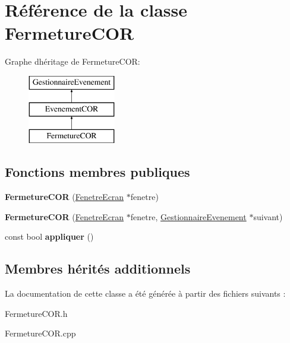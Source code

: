 \hypertarget{class_fermeture_c_o_r}{}\section{Référence de la classe Fermeture\+C\+OR}
\label{class_fermeture_c_o_r}
Graphe d\textquotesingle{}héritage de Fermeture\+C\+OR\+:\begin{figure}[H]
\begin{center}
\leavevmode
\includegraphics[height=3.000000cm]{class_fermeture_c_o_r}
\end{center}
\end{figure}
\subsection*{Fonctions membres publiques}
\begin{DoxyCompactItemize}
\item 
\mbox{\label{class_fermeture_c_o_r_a463bcc7c144ed96979c4da95eeac5106}} 
{\bfseries Fermeture\+C\+OR} (\mbox{\hyperlink{class_fenetre_ecran}{Fenetre\+Ecran}} $\ast$fenetre)
\item 
\mbox{\label{class_fermeture_c_o_r_af1e214a2c13927098dfa905a55d45774}} 
{\bfseries Fermeture\+C\+OR} (\mbox{\hyperlink{class_fenetre_ecran}{Fenetre\+Ecran}} $\ast$fenetre, \mbox{\hyperlink{class_gestionnaire_evenement}{Gestionnaire\+Evenement}} $\ast$suivant)
\item 
\mbox{\label{class_fermeture_c_o_r_a834d3ef4086874034bd5006484e96227}} 
const bool {\bfseries appliquer} ()
\end{DoxyCompactItemize}
\subsection*{Membres hérités additionnels}


La documentation de cette classe a été générée à partir des fichiers suivants \+:\begin{DoxyCompactItemize}
\item 
Fermeture\+C\+O\+R.\+h\item 
Fermeture\+C\+O\+R.\+cpp\end{DoxyCompactItemize}

